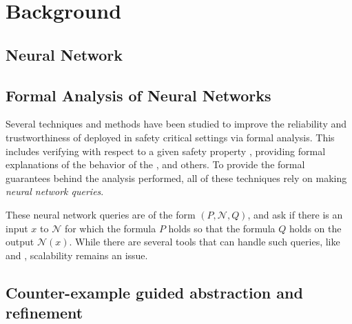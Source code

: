 \section{Background}
\subsection{Neural Network}

\subsection{ Formal Analysis of Neural Networks }

Several techniques and methods have been studied to improve the reliability and
trustworthiness of \dnn deployed in safety critical settings via formal
analysis. This includes verifying \dnn with respect to a given
safety property \cite{reluplex, cegar-nn, deeppoly, cegarette, cleverest-nn,
conv-abs-gk, deep-abstract, lin-comb-abs-jan}, providing formal explanations of
the behavior of the \dnn \cite{minimal-image-fxai, overview-fxai}, and others.
 To provide the
formal guarantees behind the analysis performed, all of these techniques rely on
making \textit{neural network queries}. 

These neural network queries are of the form $(P, \mathcal{N}, Q)$, and ask if
there is an input $x$ to $\mathcal{N}$ for which the formula $P$ holds so that
the formula $Q$ holds on the output $\mathcal{N}(x)$. While there are several
tools that can handle such queries, like \marabou and \abcrown, scalability
remains an issue.

\subsection{Counter-example guided abstraction and refinement}

